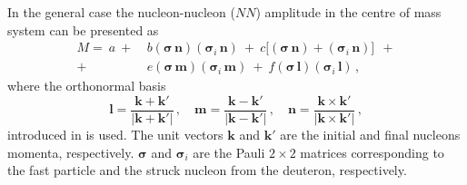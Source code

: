 \documentclass[twocolumn,epjc3]{svjour3}
\begin{document}
In the general case the nucleon-nucleon ($NN$) amplitude in the centre of mass
system can be presented as \cite{gla02}
\begin{equation}
  \label{eq:mat_full}
  \begin{split}
    M =\ a\ +\ &b
    (\boldsymbol{\sigma}\,\mathbf{n})
    (\boldsymbol{\sigma}_i\,\mathbf{n})\ +\ c\bigl[
    (\boldsymbol{\sigma}\,\mathbf{n}) +
    (\boldsymbol{\sigma}_i\,\mathbf{n})\bigr]\ \ + \\
    +\ &e
    (\boldsymbol{\sigma}\,\mathbf{m})
    (\boldsymbol{\sigma}_i\,\mathbf{m})\ +\ f
    (\boldsymbol{\sigma}\,\mathbf{l})
    (\boldsymbol{\sigma}_i\,\mathbf{l})\,,
  \end{split}
\end{equation}
where the orthonormal basis
\begin{equation}
  \mathbf{l} =
  \frac{\mathbf{k} + \mathbf{k}'}{|\mathbf{k} + \mathbf{k}'|}\,, \quad
  \mathbf{m} =
  \frac{\mathbf{k} - \mathbf{k}'}{|\mathbf{k} - \mathbf{k}'|}\,, \quad
  \mathbf{n} =
  \frac{\mathbf{k} \times \mathbf{k}'}{|\mathbf{k} \times \mathbf{k}'|}\,,
\end{equation}
introduced in \cite{gol66} is used. The unit vectors $\mathbf{k}$ and
$\mathbf{k}'$ are the initial and final nucleons momenta, respectively.
$\boldsymbol{\sigma}$ and $\boldsymbol{\sigma}_i$ are the Pauli $2\times2$
matrices corresponding to the fast particle and the struck nucleon from the
deuteron, respectively.
\end{document}

